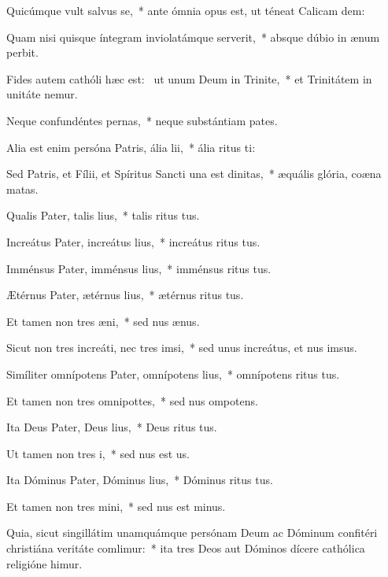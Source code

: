\item Quicúmque vult salvus se,~* ante ómnia opus est, ut téneat Calicam dem:
\item Quam nisi quisque íntegram inviolatámque serverit,~* absque dúbio in ænum perbit.
\item Fides autem cathóli hæc est:~\pscross{} ut unum Deum in Trinite,~* et Trinitátem in unitáte nemur.
\item Neque confundéntes pernas,~* neque substántiam pates.
\item Alia est enim persóna Patris, ália lii,~* ália ritus ti:
\item Sed Patris, et Fílii, et Spíritus Sancti una est dinitas,~* æquális glória, coæna matas.
\item Qualis Pater, talis lius,~* talis ritus tus.
\item Increátus Pater, increátus lius,~* increátus ritus tus.
\item Imménsus Pater, imménsus lius,~* imménsus ritus tus.
\item Ætérnus Pater, ætérnus lius,~* ætérnus ritus tus.
\item Et tamen non tres æni,~* sed nus ænus.
\item Sicut non tres increáti, nec tres imsi,~* sed unus increátus, et nus imsus.
\item Simíliter omnípotens Pater, omnípotens lius,~* omnípotens ritus tus.
\item Et tamen non tres omnipottes,~* sed nus ompotens.
\item Ita Deus Pater, Deus lius,~* Deus ritus tus.
\item Ut tamen non tres i,~* sed nus est us.
\item Ita Dóminus Pater, Dóminus lius,~* Dóminus ritus tus.
\item Et tamen non tres mini,~* sed nus est minus.
\item Quia, sicut singillátim unamquámque persónam Deum ac Dóminum confitéri christiána veritáte comlimur:~* ita tres Deos aut Dóminos dícere cathólica religióne himur.
